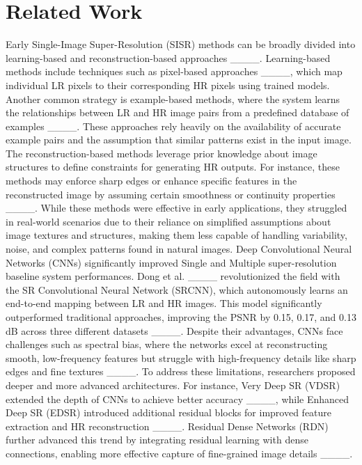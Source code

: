 \section{Related Work}
\label{sec-related}
Early Single-Image Super-Resolution (SISR) methods can be broadly divided into learning-based and reconstruction-based approaches ____. Learning-based methods include techniques such as pixel-based approaches ____, which map individual LR pixels to their corresponding HR pixels using trained models. Another common strategy is example-based methods, where the system learns the relationships between LR and HR image pairs from a predefined database of examples ____. These approaches rely heavily on the availability of accurate example pairs and the assumption that similar patterns exist in the input image. The reconstruction-based methods leverage prior knowledge about image structures to define constraints for generating HR outputs. For instance, these methods may enforce sharp edges or enhance specific features in the reconstructed image by assuming certain smoothness or continuity properties ____. While these methods were effective in early applications, they struggled in real-world scenarios due to their reliance on simplified assumptions about image textures and structures, making them less capable of handling variability, noise, and complex patterns found in natural images. Deep Convolutional Neural Networks (CNNs) significantly improved Single and Multiple super-resolution baseline system performances. Dong et al. ____ revolutionized the field with the SR Convolutional Neural Network (SRCNN), which autonomously learns an end-to-end mapping between LR and HR images. This model significantly outperformed traditional approaches, improving the PSNR by 0.15, 0.17, and 0.13 dB across three different datasets ____. Despite their advantages, CNNs face challenges such as spectral bias, where the networks excel at reconstructing smooth, low-frequency features but struggle with high-frequency details like sharp edges and fine textures ____. To address these limitations, researchers proposed deeper and more advanced architectures. For instance, Very Deep SR (VDSR) extended the depth of CNNs to achieve better accuracy ____, while Enhanced Deep SR (EDSR) introduced additional residual blocks for improved feature extraction and HR reconstruction ____. Residual Dense Networks (RDN) further advanced this trend by integrating residual learning with dense connections, enabling more effective capture of fine-grained image details ____.

